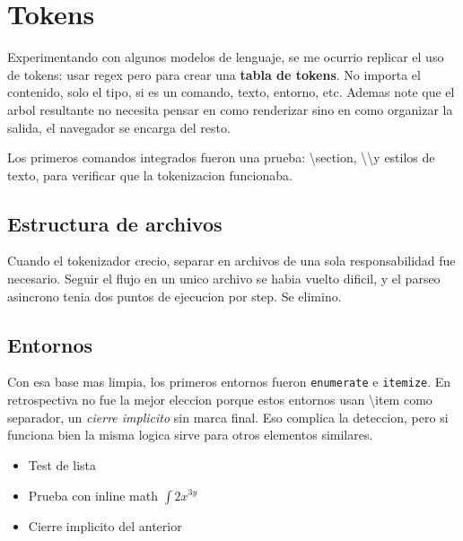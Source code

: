 \chapter{ Tokens }

  Experimentando con algunos modelos de lenguaje, se me ocurrio replicar el uso
  de tokens: usar regex pero para crear una \textbf{tabla de tokens}. No importa
  el contenido, solo el tipo, si es un comando, texto, entorno, etc. Ademas note
  que el arbol resultante no necesita pensar en como renderizar sino en como
  organizar la salida, el navegador se encarga del resto.

  Los primeros comandos integrados fueron una prueba: \backslash section,
  \backslash\backslash y estilos de texto, para verificar que la tokenizacion
  funcionaba.

  \section{ Estructura de archivos }

  Cuando el tokenizador crecio, separar en archivos de una sola responsabilidad
  fue necesario. Seguir el flujo en un unico archivo se habia vuelto dificil,
  y el parseo asincrono tenia dos puntos de ejecucion por step. Se elimino.

  \section{ Entornos }

  Con esa base mas limpia, los primeros entornos fueron \texttt{enumerate}
  e \texttt{itemize}. En retrospectiva no fue la mejor eleccion porque estos
  entornos usan \backslash item como separador, un \textit{cierre implicito}
  sin marca final. Eso complica la deteccion, pero si funciona bien la
  misma logica sirve para otros elementos similares.

  \begin{itemize}
      \item Test de lista
      \item Prueba con inline math $\int 2x^{3y}$
      \item Cierre implicito del anterior
  \end{itemize}
